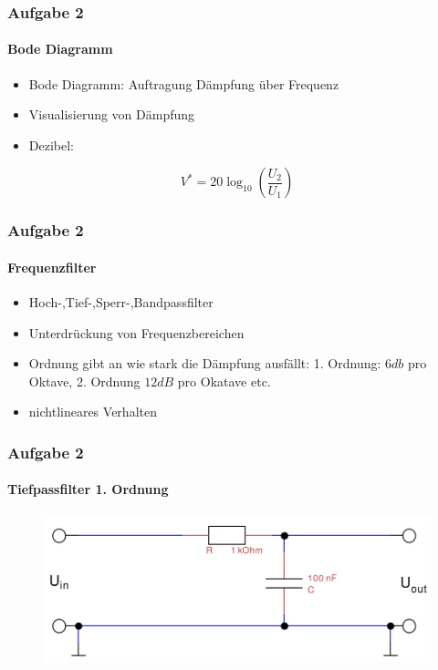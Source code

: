 \begin{frame}
\frametitle{Aufgabe 2}
\framesubtitle{Bode Diagramm}
    \begin{itemize}
        \item Bode Diagramm: Auftragung Dämpfung über Frequenz
        \item Visualisierung von Dämpfung
        \item Dezibel:
    \end{itemize}
    \begin{equation*}
        V^* = 20 \log_{10} \left( \frac{U_2}{U_1} \right) 
    \end{equation*}
\end{frame}
\begin{frame}
\frametitle{Aufgabe 2}
\framesubtitle{Frequenzfilter}
    \begin{itemize}
        \item Hoch-,Tief-,Sperr-,Bandpassfilter
        \item Unterdrückung von Frequenzbereichen
        \item Ordnung gibt an wie stark die Dämpfung ausfällt: 1. Ordnung:
        $6db$ pro Oktave, 2. Ordnung $12dB$ pro Okatave etc.
        \item nichtlineares Verhalten
    \end{itemize}
\end{frame}
\begin{frame}
\frametitle{Aufgabe 2}
\framesubtitle{Tiefpassfilter 1. Ordnung}
\begin{figure}[H]
\begin{center}
        \includegraphics[scale=0.2]{./img/2a_bode_schaltbild.png}
\end{center}
\end{figure}
\end{frame}
